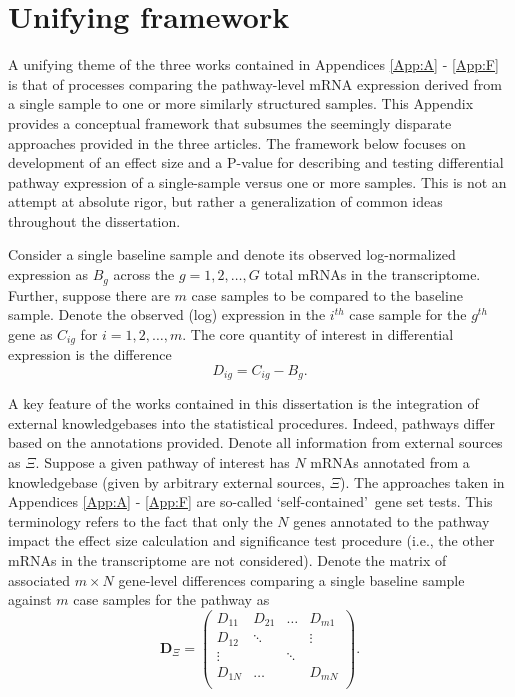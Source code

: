 \chapter{Unifying framework} \label{App:eqns}

\indent \indent A unifying theme of the three works contained in Appendices \ref{App:A} - \ref{App:F} is that of processes comparing the pathway-level mRNA expression derived from a single sample to one or more similarly structured samples. This Appendix provides a conceptual framework that subsumes the seemingly disparate approaches provided in the three articles. The framework below focuses on  development of an effect size and a P-value for describing and testing differential pathway expression of a single-sample versus one or more samples. This is not an attempt at absolute rigor, but rather a generalization of common ideas throughout the dissertation.

Consider a single baseline sample and denote its observed log-normalized expression as $B_{g}$ across the $g=1,2,\ldots,G$ total mRNAs in the transcriptome. Further, suppose there are $m$ case samples to be compared to the baseline sample. Denote the observed (log) expression in the $i^{th}$ case sample for the $g^{th}$ gene as $C_{ig}$ for $i=1,2,\ldots,m$. The core quantity of interest in differential expression is the difference
\begin{equation*}
\label{eq:diff}
D_{ig}=C_{ig}-B_{g}. \tag{1}
\end{equation*}

A key feature of the works contained in this dissertation is the integration of external knowledgebases into the statistical procedures. Indeed, pathways differ based on the annotations provided. Denote all information from external sources as $\Xi$. Suppose a given pathway of interest has $N$ mRNAs annotated from a knowledgebase (given by arbitrary external sources, $\Xi$). The approaches taken in Appendices \ref{App:A} - \ref{App:F} are so-called \lq self-contained\rq~gene set tests. This terminology refers to the fact that only the $N$ genes annotated to the pathway impact the effect size calculation and significance test procedure (i.e., the other mRNAs in the transcriptome are not considered). Denote the matrix of associated $m \times N$ gene-level differences comparing a single baseline sample against $m$ case samples for the pathway as
\begin{equation*}
  \label{eq:Dmat}
  \mathbf{D}_{\Xi} = \left ( \begin{array}{rcccc}
    D_{11} & D_{21} & \ldots & D_{m1} \\
    D_{12} & \ddots &  & \vdots \\
    \vdots &  & \ddots &  \\
    D_{1N} & \ldots &  & D_{mN} \\
\end{array} \right ) \tag{2}.
\end{equation*}


